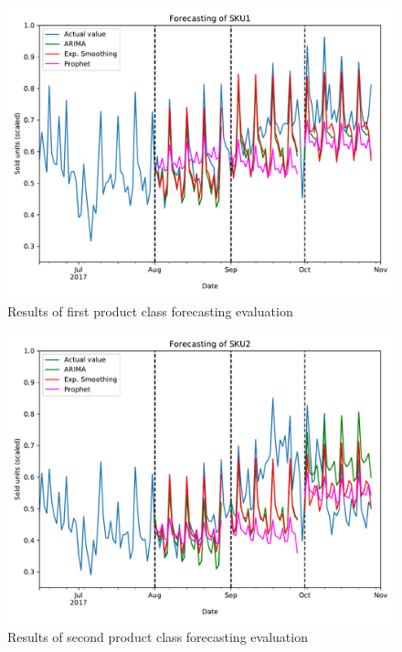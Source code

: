 \documentclass[11pt,a4paper]{article}
\begin{document}
\newpage
\begin{figure}
  \includegraphics[width=1.2\linewidth]{figures/SKU1_all.pdf}
  \caption{Results of first product class forecasting evaluation}
  \label{fig:sku1_all}
\end{figure}

\begin{figure}
  \includegraphics[width=1.2\linewidth]{figures/SKU2_all.pdf}
  \caption{Results of second product class forecasting evaluation}
  \label{fig:sku2_all}
\end{figure}
\end{document}
